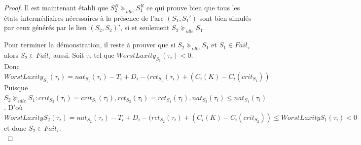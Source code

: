 \documentclass[12pt,a4paper,oneside]{book}
\theoremstyle{break}
\theoremstyle{breakplain}
\begin{document}
\begin{proof}
Il est maintenant établi que $S^R_2 \succeq_{idle} S^R_1$ ce qui prouve bien que tous les états intermédiaires nécessaires à la présence de l'arc $(S_1, S_1')$ sont bien simulés par ceux générés par le lien $(S_2, S_2)'$, si et seulement $S_2 \succeq_{idle} S_1$.\\

\pagebreak

Pour terminer la démonstration, il reste à prouver que si $S_2 \succeq_{idle} S_1$ et $S_1 \in Fail_\tau$ alors $S_2 \in Fail_\tau$ aussi. Soit $\tau_i$ tel que  $WorstLaxity_{S_1}(\tau_i) < 0$.\\

Donc $WorstLaxity_{S_1}(\tau_i) = nat_{S_1}(\tau_i) -T_i + D_i - (rct_{S_1}(\tau_i) + (C_i(K)-C_i(crit_{S_1}))$\\

Puisque $S_2 \succeq_{idle} S_1 : crit_{S_2}(\tau_i) = crit_{S_1}(\tau_i),  rct_{S_2}(\tau_i) = rct_{S_1}(\tau_i), nat_{S_2}(\tau_i) \leq nat_{S_1}(\tau_i)$. D'où $WorstLaxity{S_2}(\tau_i) = nat_{S_2}(\tau_i) -T_i + D_i - (rct_{S_2}(\tau_i) + (C_i(K)-C_i(crit_{S_2})) \leq WorstLaxity{S_1}(\tau_i) < 0$ et donc $S_2 \in Fail_\tau$.\\
\end{proof}
\end{document}
